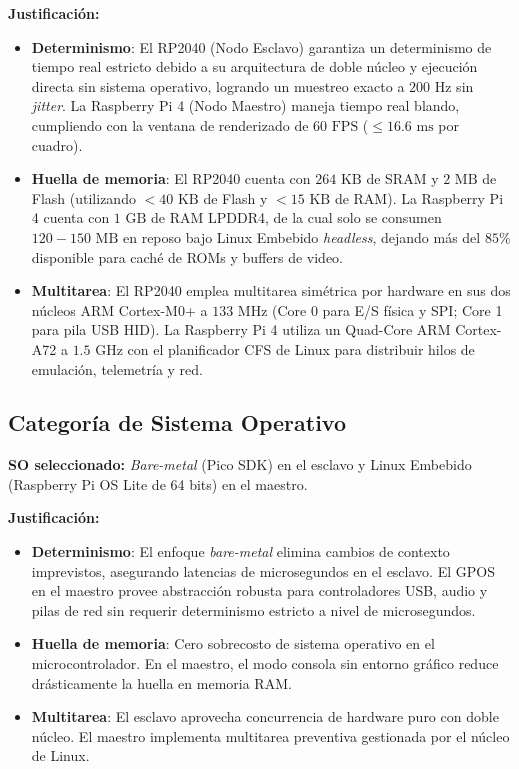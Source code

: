 \documentclass[conference]{IEEEtran}
\begin{document}
\textbf{Justificación:}
\begin{itemize}
	\item \textbf{Determinismo}: El RP2040 (Nodo Esclavo) garantiza un determinismo de tiempo real estricto debido a su arquitectura de doble núcleo y ejecución directa sin sistema operativo, logrando un muestreo exacto a $200\text{ Hz}$ sin \textit{jitter}. La Raspberry Pi 4 (Nodo Maestro) maneja tiempo real blando, cumpliendo con la ventana de renderizado de $60\text{ FPS}$ ($\le 16.6\text{ ms}$ por cuadro).
	\item \textbf{Huella de memoria}: El RP2040 cuenta con $264\text{ KB}$ de SRAM y $2\text{ MB}$ de Flash (utilizando $< 40\text{ KB}$ de Flash y $< 15\text{ KB}$ de RAM). La Raspberry Pi 4 cuenta con $1\text{ GB}$ de RAM LPDDR4, de la cual solo se consumen $120-150\text{ MB}$ en reposo bajo Linux Embebido \textit{headless}, dejando más del $85\%$ disponible para caché de ROMs y buffers de video.
	\item \textbf{Multitarea}: El RP2040 emplea multitarea simétrica por hardware en sus dos núcleos ARM Cortex-M0+ a $133\text{ MHz}$ (Core 0 para E/S física y SPI; Core 1 para pila USB HID). La Raspberry Pi 4 utiliza un Quad-Core ARM Cortex-A72 a $1.5\text{ GHz}$ con el planificador CFS de Linux para distribuir hilos de emulación, telemetría y red.
\end{itemize}

\subsection{Categoría de Sistema Operativo}

\textbf{SO seleccionado:} \textit{Bare-metal} (Pico SDK) en el esclavo y Linux Embebido (Raspberry Pi OS Lite de 64 bits) en el maestro.

\textbf{Justificación:}
\begin{itemize}
	\item \textbf{Determinismo}: El enfoque \textit{bare-metal} elimina cambios de contexto imprevistos, asegurando latencias de microsegundos en el esclavo. El GPOS en el maestro provee abstracción robusta para controladores USB, audio y pilas de red sin requerir determinismo estricto a nivel de microsegundos.
	\item \textbf{Huella de memoria}: Cero sobrecosto de sistema operativo en el microcontrolador. En el maestro, el modo consola sin entorno gráfico reduce drásticamente la huella en memoria RAM.
	\item \textbf{Multitarea}: El esclavo aprovecha concurrencia de hardware puro con doble núcleo. El maestro implementa multitarea preventiva gestionada por el núcleo de Linux.
\end{itemize}
\end{document}
